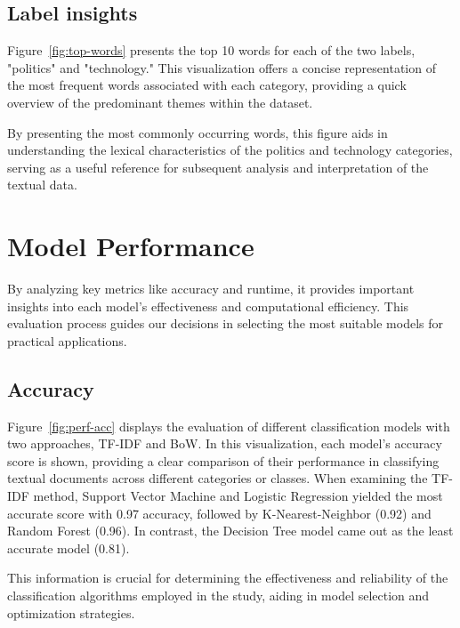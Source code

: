 \subsection{Label insights}


Figure~\ref{fig:top-words} presents the top 10 words for each of the two labels, "politics" and "technology." This visualization offers a concise representation of the most frequent words associated with each category, providing a quick overview of the predominant themes within the dataset.

By presenting the most commonly occurring words, this figure aids in understanding the lexical characteristics of the politics and technology categories, serving as a useful reference for subsequent analysis and interpretation of the textual data.

\section{Model Performance}

By analyzing key metrics like accuracy and runtime, it provides important insights into each model's effectiveness and computational efficiency. This evaluation process guides our decisions in selecting the most suitable models for practical applications.

\break

\subsection{Accuracy}


Figure~\ref{fig:perf-acc} displays the evaluation of different classification models with two approaches, TF-IDF and BoW. In this visualization, each model's accuracy score is shown, providing a clear comparison of their performance in classifying textual documents across different categories or classes. When examining the TF-IDF method, Support Vector Machine and Logistic Regression yielded the most accurate score with 0.97 accuracy, followed by K-Nearest-Neighbor (0.92) and Random Forest (0.96). In contrast, the Decision Tree model came out as the least accurate model (0.81).

This information is crucial for determining the effectiveness and reliability of the classification algorithms employed in the study, aiding in model selection and optimization strategies.

